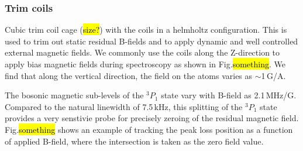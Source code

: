\subsubsection{Trim coils}
Cubic trim coil cage (\hl{size?}) with the coils in a helmholtz configuration.
This is used to trim out static residual B-fields and to apply dynamic and well controlled external magnetic fields.
We commonly use the coils along the Z-direction to apply bias magnetic fields during spectroscopy as shown in Fig.\hl{something}.
We find that along the vertical direction, the field on the atoms varies as $\sim$1\,G/A.

The bosonic magnetic sub-levels of the $^3P_1$ state vary with B-field as 2.1\,MHz/G.
Compared to the natural linewidth of 7.5\,kHz, this splitting of the $^3P_1$ state provides a very senstivie probe for precisely zeroing of the residual magnetic field.
Fig.\hl{something} shows an example of tracking the peak loss position as a function of applied B-field, where the intersection is taken as the zero field value.

